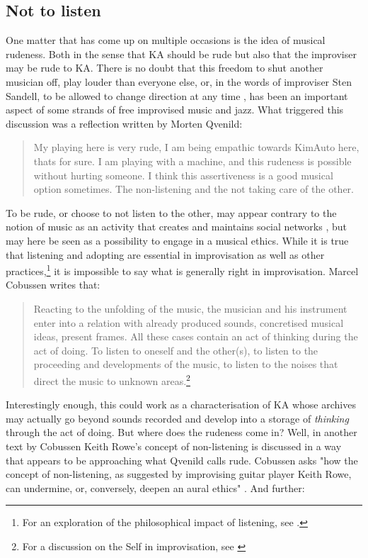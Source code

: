 \documentclass[11pt]{article}
\begin{document}
\subsection*{Not to listen}
\label{sec:org36873f8}
One matter that has come up on multiple occasions is the idea of
musical rudeness. Both in the sense that KA should be rude but also
that the improviser may be rude to KA. There is no doubt that this
freedom to shut another musician off, play louder than everyone else,
or, in the words of improviser Sten Sandell, to be allowed to change
direction at any time \citep[p. 33]{Sandell2013}, has been an
important aspect of some strands of free improvised music and
jazz. What triggered this discussion was a reflection written by
Morten Qvenild:

\begin{quote}
    My playing here is very rude, I am being empathic towards KimAuto
    here, thats for sure. I am playing with a machine, and this
    rudeness is possible without hurting someone. I think this
    assertiveness is a good musical option sometimes. The
    non-listening and the not taking care of the other. \citep[par
    12]{qvenild2019}
\end{quote}

To be rude, or choose to not listen to the other, may appear contrary
to the notion of music as an activity that creates and maintains
social networks \citep{monson98}, but may here be seen as a
possibility to engage in a musical ethics. While it is true that
listening and adopting are essential in improvisation as well as other
practices,\footnote{For an exploration of the philosophical impact of
    listening, see \citet{nancy2007}.} it is impossible to say what is
generally right in improvisation. Marcel Cobussen writes that:

\begin{quote}
    Reacting to the unfolding of the music, the musician and his
    instrument enter into a relation with already produced sounds,
    concretised musical ideas, present frames. All these cases contain
    an act of thinking during the act of doing. To listen to oneself
    and the other(s), to listen to the proceeding and developments of
    the music, to listen to the noises that direct the music to
    unknown areas.\footnote{For a discussion on the Self in
        improvisation, see \citet{frisk12-improv}}
    \citep[p. 33]{Cobussen2005}
\end{quote}

Interestingly enough, this could work as a characterisation of KA
whose archives may actually go beyond sounds recorded and develop into
a storage of \emph{thinking} through the act of doing. But where does
the rudeness come in? Well, in another text by Cobussen Keith Rowe's
concept of non-listening is discussed in a way that appears to be
approaching what Qvenild calls rude. Cobussen asks "how the concept of
non-listening, as suggested by improvising guitar player Keith Rowe,
can undermine, or, conversely, deepen an aural ethics"
\citep[p. 11]{cobussen2016}. And further:
\end{document}
